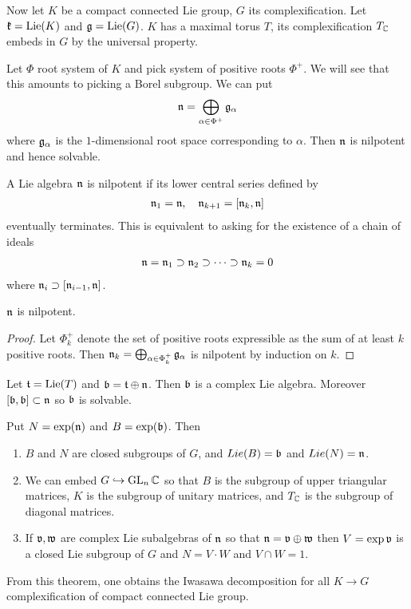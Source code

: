 \documentclass[12pt]{article}
\begin{document}
Now let $K$ be a compact connected Lie group, $G$ its complexification. Let $\mathfrak{k} = \operatorname{Lie}(K)$ and $\mathfrak{g} = \operatorname{Lie}(G)$. $K$ has a maximal torus $T$,
its complexification $T_{\mathbb{C}}$ embeds in $G$ by the universal property.

Let $\Phi$ root system of $K$ and pick system of positive roots $\Phi^+$. We will see that this amounts to picking a Borel subgroup. 
We can put \begin{align*}
    \mathfrak{n} = \bigoplus_{\alpha\in\Phi^+}\mathfrak{g}_\alpha
\end{align*} where $\mathfrak{g}_\alpha$ is the $1$-dimensional root space corresponding to $\alpha$. Then $\mathfrak{n}$ is nilpotent and hence solvable.

\begin{definition}
    A Lie algebra $\mathfrak{n}$ is nilpotent if its lower central series defined by \begin{align*}
        \mathfrak{n}_1 = \mathfrak{n},\quad \mathfrak{n}_{k+1} = [\mathfrak{n}_k,\mathfrak{n}]
    \end{align*} eventually terminates. This is equivalent to asking for the existence of a chain of ideals \begin{align*}
        \mathfrak{n} = \mathfrak{n}_1\supset \mathfrak{n}_2\supset \dots \supset \mathfrak{n}_k = 0
    \end{align*} where $\mathfrak{n}_i \supset [\mathfrak{n}_{i-1},\mathfrak{n}]$.
\end{definition} 

\begin{proposition}
    $\mathfrak{n}$ is nilpotent.
\end{proposition}
\begin{proof}
    Let $\Phi^+_k$ denote the set of positive roots expressible as the sum of at least $k$ positive roots.
    Then $\mathfrak{n}_k = \bigoplus_{\alpha\in\Phi^+_k}\mathfrak{g}_\alpha$ is nilpotent by induction on $k$.
\end{proof}
Let $\mathfrak{t} = \operatorname{Lie}(T)$ and $\mathfrak{b} = \mathfrak{t}\oplus \mathfrak{n}$. Then $\mathfrak{b}$ is a complex Lie algebra. 
Moreover $[\mathfrak{b},\mathfrak{b}]\subset \mathfrak{n}$ so $\mathfrak{b}$ is solvable.

\begin{theorem}
    Put $N = \exp(\mathfrak{n})$ and $B = \exp(\mathfrak{b})$. Then \begin{enumerate}
        \item $B$ and $N$ are closed subgroups of $G$, and $Lie(B) = \mathfrak{b}$ and $Lie(N) = \mathfrak{n}$.  
        \item We can embed $G\hookrightarrow\operatorname{GL}_n\mathbb{C}$ so that $B$ is the subgroup of upper triangular matrices,
        $K$ is the subgroup of unitary matrices, and $T_{\mathbb{C}}$ is the subgroup of diagonal matrices.
        \item If $\mathfrak{v},\mathfrak{w}$ are complex Lie subalgebras of $\mathfrak{n}$ so that $\mathfrak{n} = \mathfrak{v}\oplus \mathfrak{w}$ then $V = \exp \mathfrak{v}$ is a closed Lie subgroup of $G$
        and $N = V\cdot W$ and $V\cap W = 1$.
    \end{enumerate}
\end{theorem}
From this theorem, one obtains the Iwasawa decomposition for all $K\to G$ complexification of compact connected Lie group.
\end{document}
